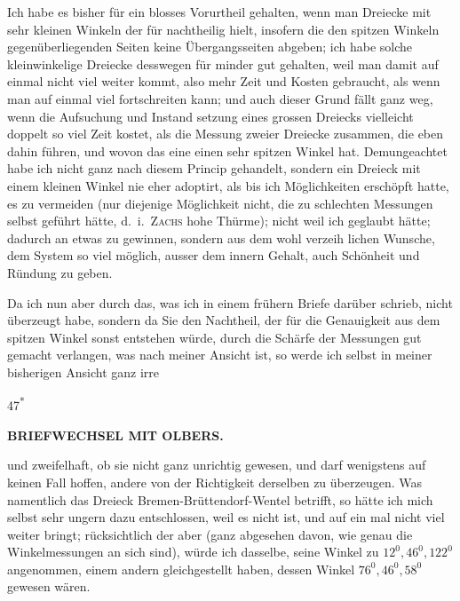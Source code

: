 \par\noindent\hspace*{\parindent}Ich habe es bisher für ein blosses Vorurtheil gehalten, wenn man Dreiecke
mit sehr kleinen Winkeln der  für nachtheilig hielt, insofern
die den spitzen Winkeln gegenüberliegenden Seiten keine Übergangsseiten
abgeben; ich habe solche kleinwinkelige Dreiecke  desswegen für minder
gut gehalten, weil man damit auf einmal nicht viel weiter kommt, also mehr
Zeit und Kosten gebraucht, als wenn man auf einmal viel fortschreiten kann;
und auch dieser Grund fällt ganz weg, wenn die Aufsuchung und Instand\-%
setzung eines grossen Dreiecks vielleicht doppelt so viel Zeit kostet, als die
Messung zweier Dreiecke zusammen, die eben dahin führen, und wovon das
eine einen sehr spitzen Winkel hat. Demungeachtet habe ich nicht ganz
nach diesem Princip gehandelt, sondern ein Dreieck mit einem kleinen Winkel
nie eher adoptirt, als bis ich  Möglichkeiten erschöpft hatte, es zu
vermeiden (nur diejenige Möglichkeit nicht, die zu schlechten Messungen
selbst geführt hätte, d.~i.\ \textsc{Zachs} hohe Thürme); nicht weil ich geglaubt hätte;
dadurch an  etwas zu gewinnen, sondern aus dem wohl verzeih\-%
lichen Wunsche, dem System so viel möglich, ausser dem innern Gehalt, auch
Schönheit und Ründung zu geben.

\par\noindent\hspace*{\parindent}Da ich nun aber  durch das, was ich in einem frühern Briefe
darüber schrieb, nicht überzeugt habe, sondern da Sie den Nachtheil, der für
die Genauigkeit aus dem spitzen Winkel sonst entstehen würde, durch die
Schärfe der Messungen gut gemacht verlangen, was nach meiner Ansicht
 ist, so werde ich selbst in meiner bisherigen Ansicht ganz irre
\par\smallskip\noindent\hfill{\footnotesize 47\textsuperscript{*}}\par
\clearpage
{}\hfill{\small\textbf{BRIEFWECHSEL MIT OLBERS.}}\par\medskip
\noindent und zweifelhaft, ob sie nicht ganz unrichtig gewesen, und darf wenigstens
auf keinen Fall hoffen, andere von der Richtigkeit derselben zu überzeugen. Was
namentlich das Dreieck Bremen-Brüttendorf-Wentel betrifft, so hätte ich mich
selbst sehr ungern dazu entschlossen, weil es nicht  ist, und auf ein\-%
mal nicht viel weiter bringt; rücksichtlich der  aber (ganz
abgesehen davon, wie genau die Winkelmessungen an sich sind), würde ich
dasselbe, seine Winkel zu \(12^{0},46^{0},122^{0}\) angenommen,  einem
andern gleichgestellt haben, dessen Winkel \(76^{0},46^{0},58^{0}\) gewesen wären.
